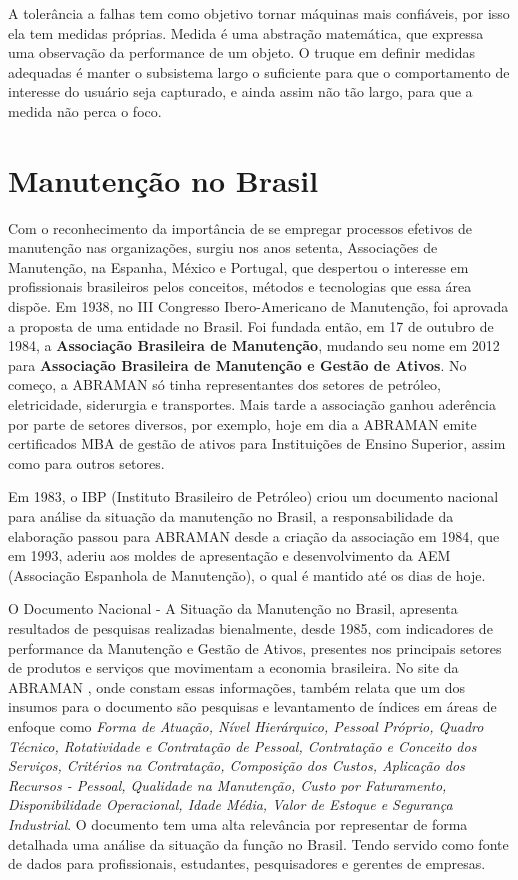 A tolerância a falhas tem como objetivo tornar máquinas mais confiáveis, por isso ela tem medidas próprias. Medida é uma abstração matemática, que expressa uma observação da performance de um objeto. O truque em definir medidas adequadas é manter o subsistema largo o suficiente para que o comportamento de interesse do usuário seja capturado, e ainda assim não tão largo, para que a medida não perca o foco.


\section{Manutenção no Brasil}

Com o reconhecimento da importância de se empregar processos efetivos de manutenção nas organizações, surgiu nos anos setenta, Associações de Manutenção, na Espanha, México e Portugal, que despertou o interesse em profissionais brasileiros pelos conceitos, métodos e tecnologias que essa área dispõe. Em 1938, no III Congresso Ibero-Americano de Manutenção, foi aprovada a proposta de uma entidade no Brasil. Foi fundada então, em 17 de outubro de 1984, a \textbf{Associação Brasileira de Manutenção}, mudando seu nome em 2012 para \textbf{Associação Brasileira de Manutenção e Gestão de Ativos}. No começo, a ABRAMAN só tinha representantes dos setores de petróleo, eletricidade, siderurgia e transportes. Mais tarde a associação ganhou aderência por parte de setores diversos, por exemplo, hoje em dia a ABRAMAN emite certificados MBA de gestão de ativos para Instituições de Ensino Superior, assim como para outros setores. 

Em 1983, o IBP (Instituto Brasileiro de Petróleo) criou um documento nacional para análise da situação da manutenção no Brasil, a responsabilidade da elaboração passou para ABRAMAN desde a criação da associação em 1984, que em 1993, aderiu aos moldes de apresentação e desenvolvimento da AEM (Associação Espanhola de Manutenção), o qual é mantido até os dias de hoje.  

O Documento Nacional - A Situação da Manutenção no Brasil, apresenta resultados de pesquisas realizadas bienalmente, desde 1985, com indicadores de performance da Manutenção e Gestão de Ativos, presentes nos principais setores de produtos e serviços que movimentam a economia brasileira. No site da ABRAMAN \cite{abraman}, onde constam essas informações, também relata que um dos insumos para o documento são pesquisas e levantamento de índices em áreas de enfoque como \emph{Forma de Atuação, Nível Hierárquico, Pessoal Próprio, Quadro Técnico, Rotatividade e Contratação de Pessoal, Contratação e Conceito dos Serviços, Critérios na Contratação, Composição dos Custos, Aplicação dos Recursos - Pessoal, Qualidade na Manutenção, Custo por Faturamento, Disponibilidade Operacional, Idade Média, Valor de Estoque e Segurança Industrial}. O documento tem uma alta relevância por representar de forma detalhada uma análise da situação da função no Brasil. Tendo servido como fonte de dados para profissionais, estudantes, pesquisadores e gerentes de empresas.

